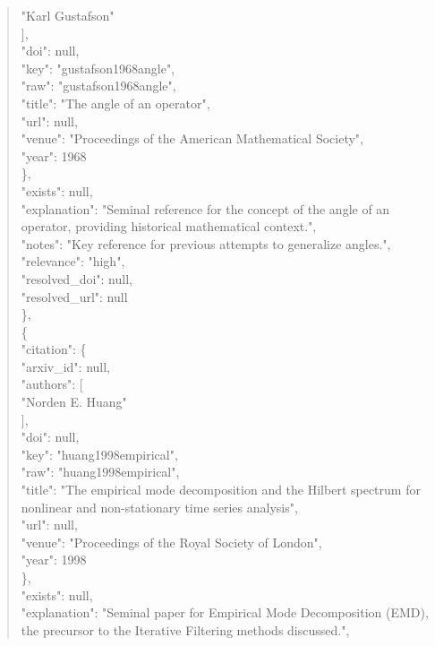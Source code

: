 \documentclass[11pt]{article}
\begin{document}
\begin{quote}
          "Karl Gustafson"\\
        ],\\
        "doi": null,\\
        "key": "gustafson1968angle",\\
        "raw": "gustafson1968angle",\\
        "title": "The angle of an operator",\\
        "url": null,\\
        "venue": "Proceedings of the American Mathematical Society",\\
        "year": 1968\\
      \},\\
      "exists": null,\\
      "explanation": "Seminal reference for the concept of the angle of an operator, providing historical mathematical context.",\\
      "notes": "Key reference for previous attempts to generalize angles.",\\
      "relevance": "high",\\
      "resolved\_doi": null,\\
      "resolved\_url": null\\
    \},\\
    \{\\
      "citation": \{\\
        "arxiv\_id": null,\\
        "authors": [\\
          "Norden E. Huang"\\
        ],\\
        "doi": null,\\
        "key": "huang1998empirical",\\
        "raw": "huang1998empirical",\\
        "title": "The empirical mode decomposition and the Hilbert spectrum for nonlinear and non-stationary time series analysis",\\
        "url": null,\\
        "venue": "Proceedings of the Royal Society of London",\\
        "year": 1998\\
      \},\\
      "exists": null,\\
      "explanation": "Seminal paper for Empirical Mode Decomposition (EMD), the precursor to the Iterative Filtering methods discussed.",\\

\end{quote}
\end{document}
